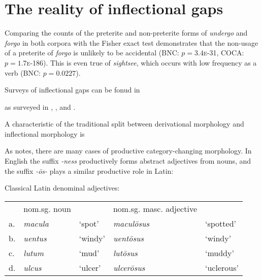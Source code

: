 \section{The reality of inflectional gaps}

Comparing the counts of the preterite and non-preterite forms of \emph{undergo} and \emph{forgo} in both corpora with the Fisher exact test demonstrates that the non-usage of a preterite of \emph{forgo} is unlikely to be accidental (BNC: $p = 3.4$\textsc{e}-31, COCA: $p = 1.7$\textsc{e}-186). This is even true of \emph{sightsee}, which occurs with low frequency as a verb (BNC: $p = 0.0227$).

Surveys of inflectional gaps can be fonud in 

as surveyed in \citealt{Fanselow2002}, \citealt{Rice2009b}, and \citealt{Baerman2010b}. 

A characteristic of the traditional split between derivational morphology and inflectional morphology is 

As \citet{Marantz1997b} notes, there are many cases of productive category-changing morphology. In English the suffix \emph{-ness} productively forms abstract adjectives from nouns, and the suffix \emph{-ōs-} plays a similar productive role in Latin:

\ex Classical Latin denominal adjectives:
\begin{tabular}{l l l l l}
   & nom.sg. noun  &            & nom.sg. masc. adjective & \\
a. & \emph{macula} & `spot'     & \emph{maculōsus}       & `spotted'     \\
b. & \emph{uentus} & `windy'    & \emph{uentōsus}        & `windy'       \\
c. & \emph{lutum } & `mud'      & \emph{lutōsus}         & `muddy'       \\
d. & \emph{ulcus}  & `ulcer'    & \emph{ulcerōsus}      & `uclerous'     \\
\end{tabular} \xe



